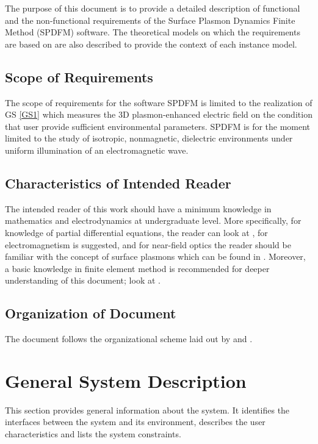 \documentclass[12pt]{article}
\begin{document}
	The purpose of this document is to provide a detailed description of functional
	and the non-functional requirements of the Surface Plasmon Dynamics Finite
	Method (SPDFM) software. The theoretical models on which the requirements are
	based on are also described to provide the context of each instance model.
	
	\subsection{Scope of Requirements}
	
	The scope of requirements for the software SPDFM is limited to the realization
	of GS \ref{GS1} which measures the 3D plasmon-enhanced electric field on the
	condition that user provide sufficient environmental parameters. SPDFM is for
	the moment limited to the study of isotropic, nonmagnetic, dielectric
	environments under uniform illumination of an electromagnetic wave.
	
	\subsection{Characteristics of Intended Reader} \label{sec_IntendedReader} The
	intended reader of this work should have a minimum knowledge in mathematics and
	electrodynamics at undergraduate level. More specifically, for knowledge of
	partial differential equations, the reader can look at 
	\cite{boyce2012elementary}, for electromagnetism 
	\cite{griffiths1962introduction} is suggested, and for near-field optics the
	reader should be familiar with the concept of surface plasmons  which can be
	found in \cite{maier2007plasmonics}. Moreover, a basic knowledge in finite
	element method is recommended for deeper understanding of this document; look at
	\cite{monk2003finite}.
	
	
	\subsection{Organization of Document}
	
	The document follows the organizational scheme laid out by
	\cite{SmithAndLai2005} and  \cite{SmithEtAl2007}.
	
	
	\section{General System Description}
	
	This section provides general information about the system.  It identifies the
	interfaces between the system and its environment, describes the user
	characteristics and lists the system constraints.
	
\end{document}
